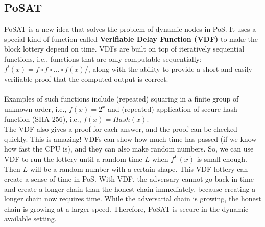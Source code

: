 \subsection{PoSAT}
PoSAT is a new idea that solves the problem of dynamic nodes in PoS. It uses a special kind of function called \textbf{Verifiable Delay Function (VDF)} to make the block lottery depend on time. VDFs are built on top of iteratively sequential functions, i.e., functions that are only computable sequentially: $f^l(x) = f \circ f \circ ... \circ f(x)$/, along with the ability to provide a short
and easily verifiable proof that the computed output is correct.\\\\
Examples of such functions include (repeated) squaring in a finite group of unknown order, i.e., $f(x) = 2^x$ and (repeated) application of secure hash function (SHA-256), i.e., $f(x) = Hash(x)$.\\
The VDF also gives a proof for each answer, and the proof can be checked quickly. This is amazing! VDFs can show how much time has passed (if we know how fast the CPU is), and they can also make random numbers. So, we can use VDF to run the lottery until a random time $L$ when $f^L(x)$ is small enough. Then $L$ will be a random number with a certain shape. This VDF lottery can create a sense of time in PoS.
With VDF, the adversary cannot go back in time and create a longer chain than the honest
chain immediately, because creating a longer chain now requires time. While the adversarial chain is
growing, the honest chain is growing at a larger speed. Therefore, PoSAT is secure in the dynamic
available setting.